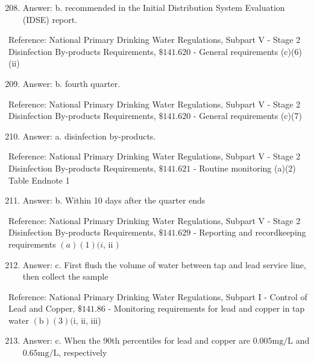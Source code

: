 \documentclass[10pt]{article}
\begin{document}
\begin{enumerate}
  \setcounter{enumi}{207}
  \item Answer: b. recommended in the Initial Distribution System Evaluation (IDSE) report.
\end{enumerate}

Reference: National Primary Drinking Water Regulations, Subpart V - Stage 2 Disinfection By-products Requirements, $\$ 141.620$ - General requirements (c)(6)(ii)

\begin{enumerate}
  \setcounter{enumi}{208}
  \item Answer: b. fourth quarter.
\end{enumerate}

Reference: National Primary Drinking Water Regulations, Subpart V - Stage 2 Disinfection By-products Requirements, $\$ 141.620$ - General requirements (c)(7)

\begin{enumerate}
  \setcounter{enumi}{209}
  \item Answer: a. disinfection by-products.
\end{enumerate}

Reference: National Primary Drinking Water Regulations, Subpart V - Stage 2 Disinfection By-products Requirements, $\$ 141.621$ - Routine monitoring (a)(2) Table Endnote 1

\begin{enumerate}
  \setcounter{enumi}{210}
  \item Answer: b. Within 10 days after the quarter ends
\end{enumerate}

Reference: National Primary Drinking Water Regulations, Subpart V - Stage 2 Disinfection By-products Requirements, $\$ 141.629$ - Reporting and recordkeeping requirements $(a)(1)(i$, ii $)$

\begin{enumerate}
  \setcounter{enumi}{211}
  \item Answer: c. First flush the volume of water between tap and lead service line, then collect the sample
\end{enumerate}

Reference: National Primary Drinking Water Regulations, Subpart I - Control of Lead and Copper, $\$ 141.86$ - Monitoring requirements for lead and copper in tap water $(\mathrm{b})(3)(\mathrm{i}$, ii, iii)

\begin{enumerate}
  \setcounter{enumi}{212}
  \item Answer: c. When the 90th percentiles for lead and copper are $0.005 \mathrm{mg} / \mathrm{L}$ and $0.65 \mathrm{mg} / \mathrm{L}$, respectively
\end{enumerate}
\end{document}
